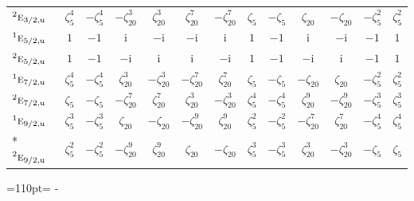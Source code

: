 \documentclass[10pt,a4paper]{article}
\newcommand{\needspace}[1]{\par\penalty-100\begingroup\dimen0=#1\relax\dimen2=\pagegoal
  \advance\dimen2-\pagetotal\ifdim\dimen0>\dimen2\relax\ifdim\dimen2>0pt\vfil\break\fi\fi
  \endgroup}
\numberwithin{equation}{section}
\newcommand{\irr}[1]{\text{\normalfont\scshape #1}}
\newcommand{\conjpair}[1]{{}^{#1}}
\newcommand{\ptag}[1]{\mathrm{#1}}
\newcommand{\iunit}{\mathrm{i}}
\newcommand{\rootunity}[1]{\zeta_{#1}}
\begin{document}
{\begin{longtable}{@{}lcccccccccccc@{}}
$\conjpair{2}\irr{e}_{3/2,\ptag{u}}$ & $\rootunity{5}^{4}$ & $-\rootunity{5}^{4}$ & $-\rootunity{20}^{3}$ & $\rootunity{20}^{3}$ & $\rootunity{20}^{7}$ & $-\rootunity{20}^{7}$ & $\rootunity{5}$ & $-\rootunity{5}$ & $\rootunity{20}$ & $-\rootunity{20}$ & $-\rootunity{5}^{2}$ & $\rootunity{5}^{2}$\\
$\conjpair{1}\irr{e}_{5/2,\ptag{u}}$ & $1$ & $-1$ & $\iunit{}$ & $-\iunit{}$ & $-\iunit{}$ & $\iunit{}$ & $1$ & $-1$ & $\iunit{}$ & $-\iunit{}$ & $-1$ & $1$\\
$\conjpair{2}\irr{e}_{5/2,\ptag{u}}$ & $1$ & $-1$ & $-\iunit{}$ & $\iunit{}$ & $\iunit{}$ & $-\iunit{}$ & $1$ & $-1$ & $-\iunit{}$ & $\iunit{}$ & $-1$ & $1$\\
$\conjpair{1}\irr{e}_{7/2,\ptag{u}}$ & $\rootunity{5}^{4}$ & $-\rootunity{5}^{4}$ & $\rootunity{20}^{3}$ & $-\rootunity{20}^{3}$ & $-\rootunity{20}^{7}$ & $\rootunity{20}^{7}$ & $\rootunity{5}$ & $-\rootunity{5}$ & $-\rootunity{20}$ & $\rootunity{20}$ & $-\rootunity{5}^{2}$ & $\rootunity{5}^{2}$\\
$\conjpair{2}\irr{e}_{7/2,\ptag{u}}$ & $\rootunity{5}$ & $-\rootunity{5}$ & $-\rootunity{20}^{7}$ & $\rootunity{20}^{7}$ & $\rootunity{20}^{3}$ & $-\rootunity{20}^{3}$ & $\rootunity{5}^{4}$ & $-\rootunity{5}^{4}$ & $\rootunity{20}^{9}$ & $-\rootunity{20}^{9}$ & $-\rootunity{5}^{3}$ & $\rootunity{5}^{3}$\\
$\conjpair{1}\irr{e}_{9/2,\ptag{u}}$ & $\rootunity{5}^{3}$ & $-\rootunity{5}^{3}$ & $\rootunity{20}$ & $-\rootunity{20}$ & $-\rootunity{20}^{9}$ & $\rootunity{20}^{9}$ & $\rootunity{5}^{2}$ & $-\rootunity{5}^{2}$ & $-\rootunity{20}^{7}$ & $\rootunity{20}^{7}$ & $-\rootunity{5}^{4}$ & $\rootunity{5}^{4}$\\*
$\conjpair{2}\irr{e}_{9/2,\ptag{u}}$ & $\rootunity{5}^{2}$ & $-\rootunity{5}^{2}$ & $-\rootunity{20}^{9}$ & $\rootunity{20}^{9}$ & $\rootunity{20}$ & $-\rootunity{20}$ & $\rootunity{5}^{3}$ & $-\rootunity{5}^{3}$ & $\rootunity{20}^{3}$ & $-\rootunity{20}^{3}$ & $-\rootunity{5}$ & $\rootunity{5}$\\
\bottomrule\end{longtable}}
\needspace{110pt}
\end{document}
